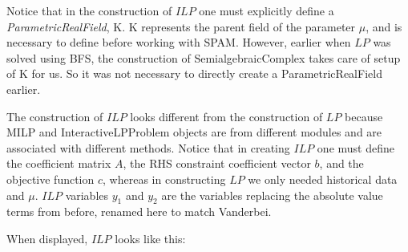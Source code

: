 \documentclass{article}
\begin{document}

Notice that in the construction of $ILP$ one must explicitly define a \textit{ParametricRealField}, K. K represents the parent field of the parameter $\mu$, and is necessary to define before working with SPAM. However, earlier when $LP$ was solved using BFS, the construction of SemialgebraicComplex takes care of setup of K for us. So it was not necessary to directly create a ParametricRealField earlier. 

The construction of $ILP$ looks different from the construction of $LP$ because MILP and InteractiveLPProblem objects are from different modules and are associated with different methods. Notice that in creating $ILP$ one must define the coefficient matrix $A$, the RHS constraint coefficient vector $b$, and the objective function $c$, whereas in constructing $LP$ we only needed historical data and $\mu$. $ILP$ variables $y_1$ and $y_2$ are the variables replacing the absolute value terms from before, renamed here to match Vanderbei.

When displayed, $ILP$ looks like this: \\

\\
\end{document}
